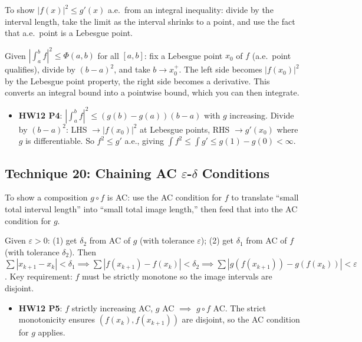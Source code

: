 \documentclass[11pt]{report}
\begin{document}
To show $|f(x)|^2 \leq g'(x)$ a.e.\ from an integral inequality: divide by the interval length, take the limit as the interval shrinks to a point, and use the fact that a.e.\ point is a Lebesgue point.

\begin{rembox}[Strategy]
Given $|\int_a^b f|^2 \leq \Phi(a,b)$ for all $[a,b]$: fix a Lebesgue point $x_0$ of $f$ (a.e.\ point qualifies), divide by $(b - a)^2$, and take $b \to x_0^+$. The left side becomes $|f(x_0)|^2$ by the Lebesgue point property, the right side becomes a derivative. This converts an integral bound into a pointwise bound, which you can then integrate.
\end{rembox}

\begin{exbox}
\begin{itemize}
\item \textbf{HW12 P4}: $|\int_a^b f|^2 \leq (g(b) - g(a))(b-a)$ with $g$ increasing. Divide by $(b-a)^2$: LHS $\to |f(x_0)|^2$ at Lebesgue points, RHS $\to g'(x_0)$ where $g$ is differentiable. So $f^2 \leq g'$ a.e., giving $\int f^2 \leq \int g' \leq g(1) - g(0) < \infty$.
\end{itemize}
\end{exbox}

\subsection{Technique 20: Chaining AC $\varepsilon$-$\delta$ Conditions}

To show a composition $g \circ f$ is AC: use the AC condition for $f$ to translate ``small total interval length'' into ``small total image length,'' then feed that into the AC condition for $g$.

\begin{rembox}[Strategy]
Given $\varepsilon > 0$: (1) get $\delta_2$ from AC of $g$ (with tolerance $\varepsilon$); (2) get $\delta_1$ from AC of $f$ (with tolerance $\delta_2$). Then $\sum |x_{k+1} - x_k| < \delta_1 \implies \sum |f(x_{k+1}) - f(x_k)| < \delta_2 \implies \sum |g(f(x_{k+1})) - g(f(x_k))| < \varepsilon$. Key requirement: $f$ must be strictly monotone so the image intervals are disjoint.
\end{rembox}

\begin{exbox}
\begin{itemize}
\item \textbf{HW12 P5}: $f$ strictly increasing AC, $g$ AC $\implies$ $g \circ f$ AC. The strict monotonicity ensures $(f(x_k), f(x_{k+1}))$ are disjoint, so the AC condition for $g$ applies.
\end{itemize}
\end{exbox}
\end{document}
